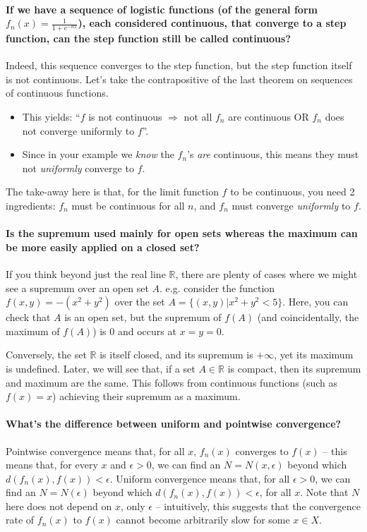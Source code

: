 \documentclass[10pt,english]{article}
\begin{document}
\paragraph{If we have a sequence of logistic functions (of the general form $f_n(x) = \frac{1}{1+e^{-nx}}$), each considered continuous, that converge to a step function, can the step function still be called continuous?}
Indeed, this sequence converges to the step function, but the step function itself is not continuous.
Let's take the contrapositive of the last theorem on sequences of continuous functions.
\begin{itemize}
\item This yields:
``$f$ is not continuous $\Rightarrow$ not all $f_n$ are continuous OR $f_n$ does not converge uniformly to $f$''.
\item Since in your example we \textit{know} the $f_n$'s \textit{are} continuous, this means they must not \textit{uniformly} converge to $f$.
\end{itemize}
The take-away here is that, for the limit function $f$ to be continuous, you need 2 ingredients: $f_n$ must be continuous for all $n$, and $f_n$ must converge \textit{uniformly} to $f$.


\paragraph{Is the supremum used mainly for open sets whereas the maximum can be more easily applied on a closed set?}
If you think beyond just the real line $\mathbb{R}$, there are plenty of cases where we might see a supremum over an open set $A$.
e.g. consider the function $f(x,y) = -(x^2 + y^2)$ over the set $A = \{(x,y) | x^2 + y^2 < 5\}$. Here, you can check that $A$ is an open set, but the supremum of $f(A)$ (and coincidentally, the maximum of $f(A)$) is $0$ and occurs at $x=y=0$.

Conversely, the set $\mathbb{R}$ is itself closed, and its supremum is $+\infty$, yet its maximum is undefined.
Later, we will see that, if a set $A\in\mathbb{R}$ is compact, then its supremum and maximum are the same.
This follows from continuous functions (such as $f(x)=x$) achieving their supremum as a maximum.


\paragraph{What's the difference between uniform and pointwise convergence?}
Pointwise convergence means that, for all $x$, $f_n(x)$ converges to $f(x)$ -- this means that, for every $x$ and $\epsilon>0$, we can find an $N = N(x,\epsilon)$ beyond which $d(f_n(x),f(x))<\epsilon$.
Uniform convergence means that, for all $\epsilon>0$, we can find an $N = N(\epsilon)$ beyond which $d(f_n(x),f(x))<\epsilon$, for all $x$. Note that $N$ here does not depend on $x$, only $\epsilon$ -- intuitively, this suggests that the convergence rate of $f_n(x)$ to $f(x)$ cannot become arbitrarily slow for some $x\in X$. 
\end{document}
